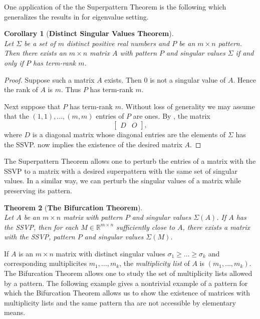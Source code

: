 \documentclass[preprint,12pt]{elsarticle}
\newcommand{\mat}{\mathbb{R}}
\newtheorem{theorem}{Theorem}[section]
\newtheorem{corollary}[theorem]{Corollary}
\begin{document}
One application of the the Superpattern Theorem is the following which generalizes the  results 
in \cite{LDuarte,MonfaredShader} for  eigenvalue setting. 

\begin{corollary}[\bf Distinct Singular Values Theorem]
\phantom{ }\\ 
\label{distinct}
Let $\Sigma$ be a set of $m$ distinct positive real numbers 
and $P$ be an $m\times n$ pattern. 
Then there exists an $m\times n$ matrix $A$ with pattern $P$
and singular values $\Sigma$ if and only if $P$ has term-rank $m$.
\end{corollary}

\begin{proof}
Suppose such a matrix $A$ exists. Then 0 is not a singular value of $A$. 
Hence  the rank of $A$ is $m$. 
Thus $P$ has term-rank $m$. 

Next suppose that $P$ has term-rank $m$.  Without loss of generality 
we may assume that the $(1,1),\ldots, (m,m)$ entries  of $P$ are ones.
By , the matrix 
\[ 
\left[ 
\begin{array}{r|r}
D& O \end{array} 
\right],
\] 
where $D$ is a diagonal matrix whose diagonal entries are the elements of $\Sigma$ has the SSVP.    now implies the existence of the desired matrix $A$. 
\end{proof}
The Superpattern Theorem allows one to perturb the entries of a matrix with the SSVP to a matrix with a desired superpattern with the same set of singular values. In a similar way, we can perturb the singular values of a matrix while preserving its pattern.  
\begin{theorem}[\bf The Bifurcation Theorem]
    \label{bifurcation}
\phantom{ } \\ 
Let $A$ be an $m\times n$ matrix with  pattern $P$ 
and singular values $\Sigma(A)$. 
If $A$ has the SSVP, then for each $M \in \mat^{m\times n}$ sufficiently close to $A$, there exists a matrix with the SSVP, 
 pattern $P$ and singular values $\Sigma(M)$.
\end{theorem}

If $A$ is an $m \times n$ matrix with distinct singular values $\sigma_1 \geq \dots \geq \sigma_k$ and corresponding multiplicites $m_1,\dots,m_k$, the \textit{multiplicity list} of $A$ is $ (m_1,\dots,m_k)$. The Bifurcation Theorem allows one to study the set of multiplicity lists allowed by a pattern. The following example gives a nontrivial example of a pattern for which the Bifurcation Theorem allows us to show the existence of matrices with multiplicity lists and the same pattern tha are not accessible by elementary means.
\end{document}
